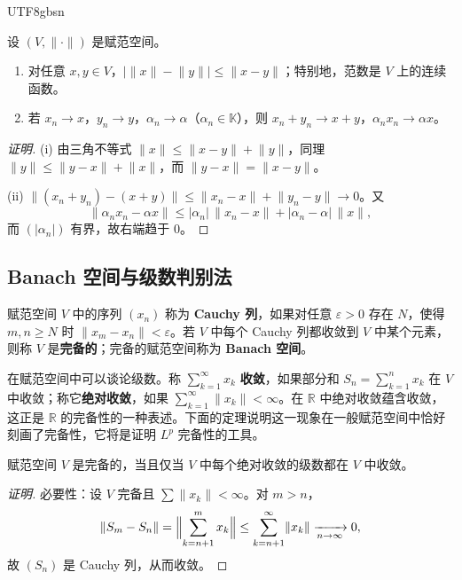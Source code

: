 \documentclass[11pt]{article}
\newcommand{\K}{\mathbb{K}}
\newcommand{\R}{\mathbb{R}}
\newcommand{\norm}[1]{\lVert #1\rVert}
\begin{document}
\begin{CJK*}{UTF8}{gbsn}
\begin{proposition}\label{prop:norm-cont}
设 $(V,\norm{\cdot})$ 是赋范空间。
\begin{enumerate}
\item 对任意 $x,y\in V$，$\bigl|\norm{x}-\norm{y}\bigr|\le\norm{x-y}$；特别地，范数是 $V$ 上的连续函数。
\item 若 $x_{n}\to x$，$y_{n}\to y$，$\alpha_{n}\to\alpha$（$\alpha_n\in\K$），则 $x_{n}+y_{n}\to x+y$，$\alpha_{n}x_{n}\to\alpha x$。
\end{enumerate}
\end{proposition}

\begin{proof}[证明]
(i) 由三角不等式 $\norm{x}\le\norm{x-y}+\norm{y}$，同理 $\norm{y}\le\norm{y-x}+\norm{x}$，而 $\norm{y-x}=\norm{x-y}$。

(ii) $\norm{(x_{n}+y_{n})-(x+y)}\le\norm{x_{n}-x}+\norm{y_{n}-y}\to0$。又
\[
\norm{\alpha_{n}x_{n}-\alpha x}\le|\alpha_{n}|\,\norm{x_{n}-x}+|\alpha_{n}-\alpha|\,\norm{x},
\]
而 $(|\alpha_{n}|)$ 有界，故右端趋于 $0$。
\end{proof}

\subsection{Banach 空间与级数判别法}

\begin{definition}[Banach 空间]
赋范空间 $V$ 中的序列 $(x_{n})$ 称为 \textbf{Cauchy 列}，如果对任意 $\varepsilon>0$ 存在 $N$，使得 $m,n\ge N$ 时 $\norm{x_{m}-x_{n}}<\varepsilon$。若 $V$ 中每个 Cauchy 列都收敛到 $V$ 中某个元素，则称 $V$ 是\textbf{完备的}；完备的赋范空间称为 \textbf{Banach 空间}。
\end{definition}

在赋范空间中可以谈论级数。称 $\sum_{k=1}^{\infty}x_{k}$ \textbf{收敛}，如果部分和 $S_{n}=\sum_{k=1}^{n}x_{k}$ 在 $V$ 中收敛；称它\textbf{绝对收敛}，如果 $\sum_{k=1}^{\infty}\norm{x_{k}}<\infty$。在 $\R$ 中绝对收敛蕴含收敛，这正是 $\R$ 的完备性的一种表述。下面的定理说明这一现象在一般赋范空间中恰好刻画了完备性，它将是证明 $L^{p}$ 完备性的工具。

\begin{theorem}[完备性的级数判别法]\label{thm:series}
赋范空间 $V$ 是完备的，当且仅当 $V$ 中每个绝对收敛的级数都在 $V$ 中收敛。
\end{theorem}

\begin{proof}[证明]
必要性：设 $V$ 完备且 $\sum\norm{x_{k}}<\infty$。对 $m>n$，
\[
\norm{S_{m}-S_{n}}=\Bigl\|\sum_{k=n+1}^{m}x_{k}\Bigr\|\le\sum_{k=n+1}^{\infty}\norm{x_{k}}\xrightarrow[n\to\infty]{}0,
\]
故 $(S_{n})$ 是 Cauchy 列，从而收敛。


\end{proof}
\end{CJK*}
\end{document}
